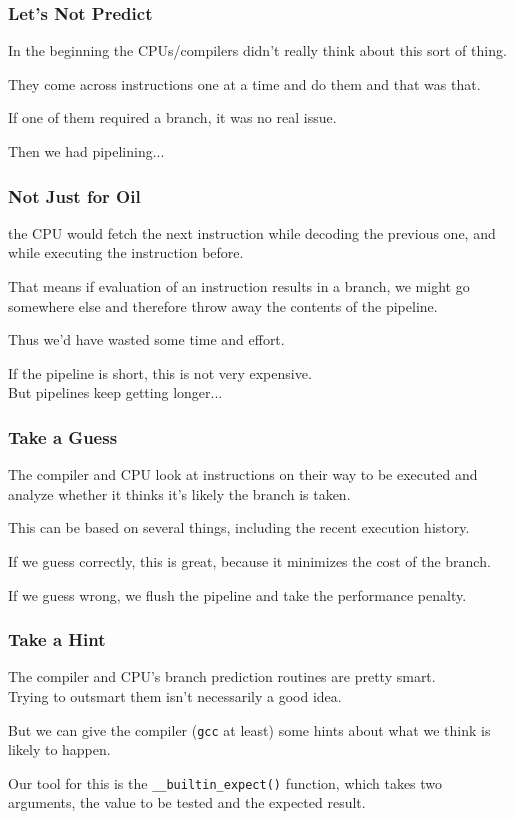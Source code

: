 \begin{frame}
\frametitle{Let's Not Predict}

In the beginning the CPUs/compilers didn't really think about this sort of thing.

They come across instructions one at a time and do them and that was that. 

If one of them required a branch, it was no real issue. 

Then we had pipelining...
\end{frame}



\begin{frame}
\frametitle{Not Just for Oil}

the CPU would fetch the next instruction while decoding the previous one, and while executing the instruction before. 

That means if evaluation of an instruction results in a branch, we might go somewhere else and therefore throw away the contents of the pipeline. 

Thus we'd have wasted some time and effort. 

If the pipeline is short, this is not very expensive.\\
\quad But pipelines keep getting longer... 

\end{frame}



\begin{frame}
\frametitle{Take a Guess}

The compiler and CPU look at instructions on their way to be executed and analyze whether it thinks it's likely the branch is taken. 

This can be based on several things, including the recent execution history. 

If we guess correctly, this is great, because it minimizes the cost of the branch. 

If we guess wrong, we flush the pipeline and take the performance penalty.

\end{frame}



\begin{frame}
\frametitle{Take a Hint}

The compiler and CPU's branch prediction routines are pretty smart.\\
\quad Trying to outsmart them isn't necessarily a good idea. 

But we can give the compiler (\texttt{gcc} at least) some hints about what we think is likely to happen. 

Our tool for this is the \texttt{\_\_builtin\_expect()} function, which takes two arguments, the value to be tested and the expected result.

\end{frame}




